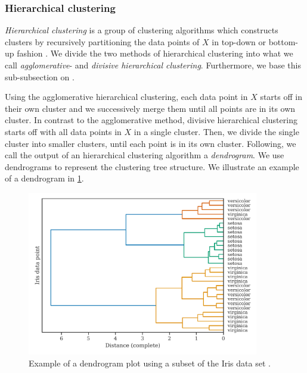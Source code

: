 \subsubsection{Hierarchical clustering}
\label{sec:hierarchical-clustering}
\textit{Hierarchical clustering} is a group of clustering algorithms which constructs clusters by recursively partitioning the data points of $X$ in top-down or bottom-up fashion \cite{Rokach2005}. We divide the two methods of hierarchical clustering into what we call \textit{agglomerative}- and \textit{divisive hierarchical clustering}. Furthermore, we base this sub-subsection on \cite{Rokach2005}.

Using the agglomerative hierarchical clustering, each data point in $X$ starts off in their own cluster and we successively merge them until all points are in its own cluster. In contrast to the agglomerative method, divisive hierarchical clustering starts off with all data points in $X$ in a single cluster. Then, we divide the single cluster into smaller clusters, until each point is in its own cluster. Following, we call the output of an hierarchical clustering algorithm a \textit{dendrogram}. We use dendrograms to represent the clustering tree structure. We illustrate an example of a dendrogram in \cref{fig:dendrogram-example}.
\begin{figure}[H]
    \centering
    \includegraphics[width=0.9\textwidth]{thesis/figures/dendrogram-example.pdf}
    \caption{Example of a dendrogram plot using a subset of the Iris data set \cite{Fisher1936}.}
    \label{fig:dendrogram-example}
\end{figure}

